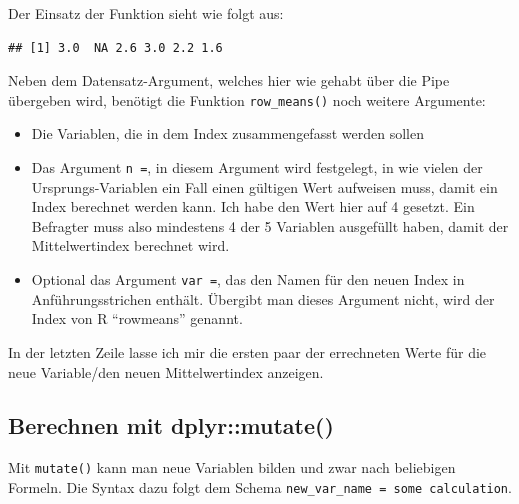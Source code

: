 \documentclass[
]{book}
\newenvironment{Shaded}{\begin{snugshade}}{\end{snugshade}}
\newcommand{\AttributeTok}[1]{\textcolor[rgb]{0.77,0.63,0.00}{#1}}
\newcommand{\DecValTok}[1]{\textcolor[rgb]{0.00,0.00,0.81}{#1}}
\newcommand{\FunctionTok}[1]{\textcolor[rgb]{0.00,0.00,0.00}{#1}}
\newcommand{\NormalTok}[1]{#1}
\newcommand{\OtherTok}[1]{\textcolor[rgb]{0.56,0.35,0.01}{#1}}
\newcommand{\SpecialCharTok}[1]{\textcolor[rgb]{0.00,0.00,0.00}{#1}}
\newcommand{\StringTok}[1]{\textcolor[rgb]{0.31,0.60,0.02}{#1}}
\begin{document}
Der Einsatz der Funktion sieht wie folgt aus:

\begin{Shaded}
\end{Shaded}

\begin{verbatim}
## [1] 3.0  NA 2.6 3.0 2.2 1.6
\end{verbatim}

Neben dem Datensatz-Argument, welches hier wie gehabt über die Pipe übergeben wird, benötigt die Funktion \texttt{row\_means()} noch weitere Argumente:

\begin{itemize}
\item
  Die Variablen, die in dem Index zusammengefasst werden sollen
\item
  Das Argument \texttt{n\ =}, in diesem Argument wird festgelegt, in wie vielen der Ursprungs-Variablen ein Fall einen gültigen Wert aufweisen muss, damit ein Index berechnet werden kann. Ich habe den Wert hier auf 4 gesetzt. Ein Befragter muss also mindestens 4 der 5 Variablen ausgefüllt haben, damit der Mittelwertindex berechnet wird.
\item
  Optional das Argument \texttt{var\ =}, das den Namen für den neuen Index in Anführungsstrichen enthält. Übergibt man dieses Argument nicht, wird der Index von R ``rowmeans'' genannt.
\end{itemize}

In der letzten Zeile lasse ich mir die ersten paar der errechneten Werte für die neue Variable/den neuen Mittelwertindex anzeigen.

\hypertarget{berechnen-mit-dplyrmutate}{%
\subsection{Berechnen mit dplyr::mutate()}\label{berechnen-mit-dplyrmutate}}

Mit \texttt{mutate()} kann man neue Variablen bilden und zwar nach beliebigen Formeln. Die Syntax dazu folgt dem Schema \texttt{new\_var\_name\ =\ some\ calculation}.
\end{document}
